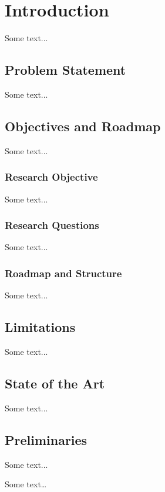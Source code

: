 \newpage
\section{Introduction}

Some text... \cite{acceptance-telepresence-robots-2022}

\subsection{Problem Statement}

Some text...

\subsection{Objectives and Roadmap}

Some text...

\subsubsection{Research Objective}

Some text...

\subsubsection{Research Questions}

Some text...

\subsubsection{Roadmap and Structure}

Some text...

\subsection{Limitations}

Some text...

\subsection{State of the Art}

Some text...

\subsection{Preliminaries}

Some text...


Some text\ldots~\cite[1-2]{acceptance-telepresence-robots-2022}


